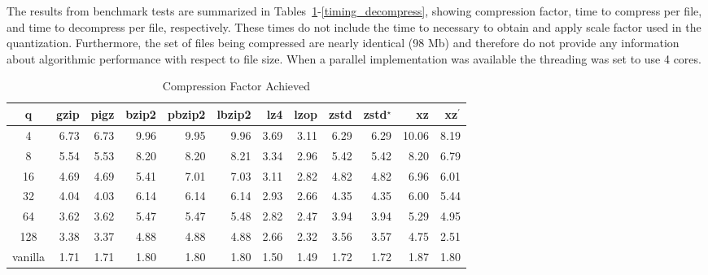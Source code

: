 The results from benchmark tests are summarized in Tables~\ref{compress_factor}-\ref{timing_decompress}, 
showing compression factor, time to compress per file, and time to decompress per file, respectively.
These times do not include the time to necessary to obtain and apply scale factor used in the quantization.  
Furthermore, the set of files being compressed are nearly identical (98 Mb) and therefore do not provide 
any information about algorithmic performance with respect to file size.  When a parallel implementation
was available the threading was set to use 4 cores.


\begin{table}
\caption{Compression Factor Achieved}
\centering
\begin{tabular}[]{crrrrrrrrrrr}
\hline
 q        &  gzip & pigz & bzip2 & pbzip2 & lbzip2 & lz4 & lzop & zstd & zstd$^\star$ & xz & xz$^\prime$  \\
\hline
 4       &   6.73 &  6.73 &  9.96 &  9.95 &  9.96 &  3.69 &  3.11 &  6.29 &  6.29 & 10.06 &  8.19  \\
 8       &   5.54 &  5.53 &  8.20 &  8.20 &  8.21 &  3.34 &  2.96 &  5.42 &  5.42 &  8.20 &  6.79  \\
 16      &   4.69 &  4.69 &  5.41 &  7.01 &  7.03 &  3.11 &  2.82 &  4.82 &  4.82 &  6.96 &  6.01  \\
 32      &   4.04 &  4.03 &  6.14 &  6.14 &  6.14 &  2.93 &  2.66 &  4.35 &  4.35 &  6.00 &  5.44  \\
 64      &   3.62 &  3.62 &  5.47 &  5.47 &  5.48 &  2.82 &  2.47 &  3.94 &  3.94 &  5.29 &  4.95  \\
 128     &   3.38 &  3.37 &  4.88 &  4.88 &  4.88 &  2.66 &  2.32 &  3.56 &  3.57 &  4.75 &  2.51  \\
 vanilla  &   1.71 &  1.71 &  1.80 &  1.80 &  1.80 &  1.50 &  1.49 &  1.72 &  1.72 &  1.87 &  1.80  \\
\hline
\end{tabular}
\label{compress_factor}
\end{table}


